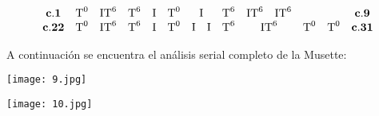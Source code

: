 		\[\begin{array}{*{12}c}
			\mathbf{c}.\mathbf{1}&\text{T}^0&\text{IT}^6&\text{T}^6&\text{I}&\text{T}^0&\text{I}&\text{T}^6&
				\begin{matrix}\text{IT}^6&\text{IT}^6\\
				\end{matrix}
			&&&\mathbf{c}.\mathbf{9}\\
			\mathbf{c}.\mathbf{22}&\text{T}^0&\text{IT}^6&\text{T}^6&\text{I}&\text{T}^0&
				\begin{matrix}
				\text{I}&\text{I}\\
				\end{matrix}
			&\text{T}^6&\text{IT}^6&\text{T}^0&\text{T}^0&\mathbf{c}.\mathbf{31}\\\end{array}\]
		
		A continuación se encuentra el análisis serial completo de la Musette:
		
		\texttt{[image: 9.jpg]}
		
		\texttt{[image: 10.jpg]}